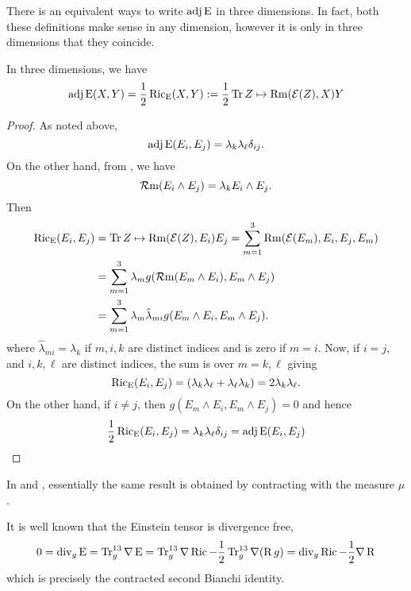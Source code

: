 \documentclass[a4paper, 12pt]{amsart}
\begin{document}
There is an equivalent ways to write \(\operatorname{adj}\operatorname{E}\) in three dimensions. In fact, both these definitions make sense in any dimension, however it is only in three dimensions that they coincide.
\begin{lemma}
\label{eq:xcf_equiv}
In three dimensions, we have
\[
\operatorname{adj}\operatorname{E}(X, Y) = \frac{1}{2} \operatorname{Ric}_{\operatorname{E}} (X, Y) := \frac{1}{2} \operatorname{Tr} Z \mapsto \operatorname{Rm}(\operatorname{\mathcal{E}}(Z), X) Y
\]
\end{lemma}
\begin{proof}
As noted above,
\[
\operatorname{adj}\operatorname{E}(E_i, E_j) = \lambda_k \lambda_{\ell} \delta_{ij}.
\]
On the other hand, from , we have
\[
\operatorname{\mathcal{R}m}(E_i \wedge E_j) = \lambda_k E_i \wedge E_j.
\]
Then
\[
\begin{split}
\operatorname{Ric}_{\operatorname{E}}(E_i, E_j) &= \operatorname{Tr} Z \mapsto \operatorname{Rm}(\operatorname{\mathcal{E}}(Z), E_i) E_j = \sum_{m=1}^3 \operatorname{Rm}(\operatorname{\mathcal{E}}(E_m), E_i, E_j, E_m) \\
&= \sum_{m=1}^3 \lambda_m g(\operatorname{\mathcal{R}m}(E_m \wedge E_i), E_m \wedge E_j) \\
&= \sum_{m=1}^3 \lambda_m \hat{\lambda}_{mi} g(E_m \wedge E_i, E_m \wedge E_j).
\end{split}
\]
where \(\hat{\lambda}_{mi} = \lambda_k\) if \(m,i,k\) are distinct indices and is zero if \(m=i\). Now, if \(i = j\), and \(i, k, \ell\) are distinct indices, the sum is over \(m=k, \ell\) giving
\[
\operatorname{Ric}_{\operatorname{E}}(E_i, E_j) = \left(\lambda_k \lambda_{\ell} + \lambda_{\ell} \lambda_k\right) = 2\lambda_k \lambda_{\ell}.
\]
On the other hand, if \(i \ne j\), then \(g(E_m \wedge E_i, E_m \wedge E_j) = 0\) and hence
\[
\frac{1}{2} \operatorname{Ric}_{\operatorname{E}}(E_i, E_j) =  \lambda_k \lambda_{\ell} \delta_{ij} = \operatorname{adj}\operatorname{E}(E_i, E_j)
\]
\end{proof}
\begin{rem}
In \cite[Lemma 3]{MR2055396} and \cite[Equation (3)]{MR2207496}, essentially the same result is obtained by contracting with the measure \(\mu\).
\end{rem}


It is well known that the Einstein tensor is divergence free,
\begin{equation}
\label{eq:ein_divfree}
0 = \operatorname{div}_g \operatorname{E} = \operatorname{Tr}_g^{13} \nabla \operatorname{E} = \operatorname{Tr}_g^{13} \nabla \operatorname{Ric} - \frac{1}{2} \operatorname{Tr}_g^{13} \nabla (\operatorname{R} g) = \operatorname{div}_g \operatorname{Ric} - \frac{1}{2} \nabla \operatorname{R}
\end{equation}
which is precisely the contracted second Bianchi identity.
\end{document}
